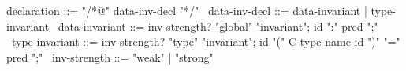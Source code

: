 \begin{syntax}
  declaration ::= "/*@" data-inv-decl "*/"
  \
  data-inv-decl ::= data-invariant | type-invariant
  \
  data-invariant ::= {inv-strength?} "global" "invariant";
                      id ":" pred ";"
  \
  type-invariant ::= {inv-strength?} "type" "invariant";
                      id "(" C-type-name id ")" "=" pred ";"
  \
  {inv-strength} ::= { "weak" } | { "strong" }
\end{syntax}